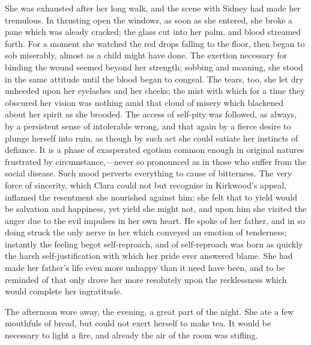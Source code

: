 She was exhausted after her long walk, and the scene with Sidney had
made her tremulous. In thrusting open the windows, as soon as she
entered, she broke a pane which was aleady cracked; the glass cut into
her palm, and blood streamed forth. For a moment she watched the red
drops falling to the floor, then began to sob miserably, almost as a
child {}might have done. The exertion necessary for binding the wound
seemed beyond her strength; sobbing and moaning, she stood in the same
attitude until the blood began to congeal. The tears, too, she let dry
unheeded upon her eyelashes and her cheeks; the mist with which for a
time they obscured her vision was nothing amid that cloud of misery
which blackened about her spirit as she brooded. The access of self-pity
was followed, as always, by a persistent sense of intolerable wrong, and
that again by a fierce desire to plunge herself into ruin, as though by
such act she could satiate her instincts of defiance. It is a phase of
exasperated egotism common enough in original natures frustrated by
circumstance,---never so pronounced as in those who suffer from the
social disease. Such mood perverts everything to cause of bitterness.
The very force of sincerity, which Clara could not but recognise in
Kirkwood's appeal, inflamed the resentment she nourished against him;
she felt that to yield would be salvation and happiness, yet yield she
might not, and {}upon him she visited the anger due to the evil impulses
in her own heart. He spoke of her father, and in so doing struck the
only nerve in her which conveyed an emotion of tenderness; instantly the
feeling begot self-reproach, and of self-reproach was born as quickly
the harsh self-justification with which her pride ever answered blame.
She had made her father's life even more unhappy than it need have been,
and to be reminded of that only drove her more resolutely upon the
recklessness which would complete her ingratitude.

The afternoon wore away, the evening, a great part of the night. She ate
a few mouthfuls of bread, but could not exert herself to make tea. It
would be necessary to light a fire, and already the air of the room was
stifling.

